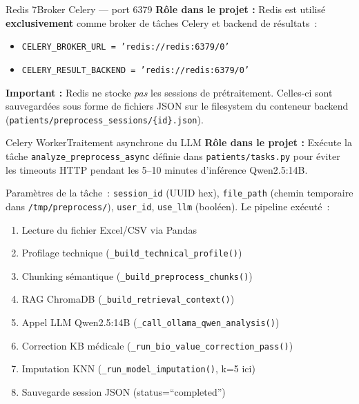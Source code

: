 \documentclass[12pt,a4paper]{article}
\begin{document}
\begin{toolbox}{Redis 7}{Broker Celery --- port 6379}
\textbf{Rôle dans le projet :} Redis est utilisé \textbf{exclusivement} comme
broker de tâches Celery et backend de résultats~:
\begin{itemize}[leftmargin=1.5em, itemsep=2pt]
  \item \texttt{CELERY\_BROKER\_URL = 'redis://redis:6379/0'}
  \item \texttt{CELERY\_RESULT\_BACKEND = 'redis://redis:6379/0'}
\end{itemize}
\textbf{Important :} Redis ne stocke \textit{pas} les sessions de prétraitement.
Celles-ci sont sauvegardées sous forme de fichiers JSON sur le filesystem du
conteneur backend (\texttt{patients/preprocess\_sessions/\{id\}.json}).
\end{toolbox}

\begin{toolbox}{Celery Worker}{Traitement asynchrone du LLM}
\textbf{Rôle dans le projet :} Exécute la tâche \texttt{analyze\_preprocess\_async}
définie dans \texttt{patients/tasks.py} pour éviter les timeouts HTTP pendant les
5--10 minutes d'inférence Qwen2.5:14B.

Paramètres de la tâche~: \texttt{session\_id} (UUID hex), \texttt{file\_path}
(chemin temporaire dans \texttt{/tmp/preprocess/}), \texttt{user\_id},
\texttt{use\_llm} (booléen). Le pipeline exécuté~:
\begin{enumerate}[leftmargin=2em, itemsep=1pt]
  \item Lecture du fichier Excel/CSV via Pandas
  \item Profilage technique (\texttt{\_build\_technical\_profile()})
  \item Chunking sémantique (\texttt{\_build\_preprocess\_chunks()})
  \item RAG ChromaDB (\texttt{\_build\_retrieval\_context()})
  \item Appel LLM Qwen2.5:14B (\texttt{\_call\_ollama\_qwen\_analysis()})
  \item Correction KB médicale (\texttt{\_run\_bio\_value\_correction\_pass()})
  \item Imputation KNN (\texttt{\_run\_model\_imputation()}, k=5 ici)
  \item Sauvegarde session JSON (status=``completed'')
\end{enumerate}
\end{toolbox}
\end{document}
